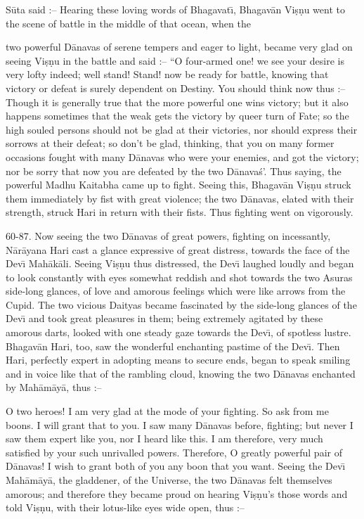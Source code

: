S\=uta said :-- Hearing these loving words of Bhagavat\={\i}, Bhagav\=an Vi\d{s}\d{n}u went to the scene of battle in the middle of that ocean, when the

two powerful D\=anavas of serene tempers and eager to light, became very glad on seeing Vi\d{s}\d{n}u in the battle and said :-- ``O four-armed one! we see your desire is very lofty indeed; well stand! Stand! now be ready for battle, knowing that victory or defeat is surely dependent on Destiny. You should think now thus :-- Though it is generally true that the more powerful one wins victory; but it also happens sometimes that the weak gets the victory by queer turn of Fate; so the high souled persons should not be glad at their victories, nor should express their sorrows at their defeat; so don't be glad, thinking, that you on many former occasions fought with many D\=anavas who were your enemies, and got the victory; nor be sorry that now you are defeated by the two D\=anava\'s'. Thus saying, the powerful Madhu Kaitabha came up to fight. Seeing this, Bhagav\=an Vi\d{s}\d{n}u struck them immediately by fist with great violence; the two D\=anavas, elated with their strength, struck Hari in return with their fists. Thus fighting went on vigorously.

60-87. Now seeing the two D\=anavas of great powers, fighting on incessantly, N\=ar\=ayana Hari cast a glance expressive of great distress, towards the face of the Dev\={\i} Mah\=ak\=ali. Seeing Vi\d{s}\d{n}u thus distressed, the Dev\={\i} laughed loudly and began to look constantly with eyes somewhat reddish and shot towards the two Asuras side-long glances, of love and amorous feelings which were like arrows from the Cupid. The two vicious Daityas became fascinated by the side-long glances of the Dev\={\i} and took great pleasures in them; being extremely agitated by these amorous darts, looked with one steady gaze towards the Dev\={\i}, of spotless lustre. Bhagav\=an Hari, too, saw the wonderful enchanting pastime of the Dev\={\i}. Then Hari, perfectly expert in adopting means to secure ends, began to speak smiling and in voice like that of the rambling cloud, knowing the two D\=anavas enchanted by Mah\=am\=ay\=a, thus :--

O two heroes! I am very glad at the mode of your fighting. So ask from me boons. I will grant that to you. I saw many D\=anavas before, fighting; but never I saw them expert like you, nor I heard like this. I am therefore, very much satisfied by your such unrivalled powers. Therefore, O greatly powerful pair of D\=anavas! I wish to grant both of you any boon that you want. Seeing the Dev\={\i} Mah\=am\=ay\=a, the gladdener, of the Universe, the two D\=anavas felt themselves amorous; and therefore they became proud on hearing Vi\d{s}\d{n}u's those words and told Vi\d{s}\d{n}u, with their lotus-like eyes wide open, thus :--


